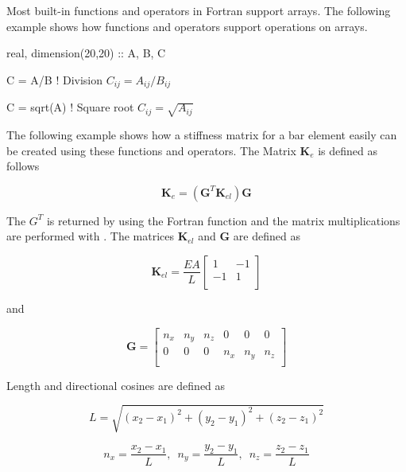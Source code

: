 Most built-in functions and operators in Fortran support arrays. The following example shows how functions and operators support operations on arrays.

\begin{fortrancodeenv}
real, dimension(20,20) :: A, B, C

C = A/B ! Division $C_{ij}=A_{ij}/B_{ij}$

C = sqrt(A) ! Square root $C_{ij}=\sqrt{A_{ij}}$
\end{fortrancodeenv}

The following example shows how a stiffness matrix for a bar element easily can be created using these functions and operators. The Matrix $\mathbf{K}_{e}$ is defined as follows

\begin{equation}
\mathbf{K}_{e} =(\mathbf{G}^{T} \mathbf{K}_{el} )\mathbf{G}
\end{equation}

The $G^T$ is returned by using the Fortran function  and the matrix multiplications are performed with . The matrices $\mathbf{K}_{el}$ and $\mathbf{G}$ are defined as

\begin{equation}
\mathbf{K}_{el} =\frac{EA}{L} \left[
\begin{array}{cc}
1 & -1 \\
-1 & 1 \\
\end{array}
\right]
\end{equation}

and

\begin{equation}
\mathbf{G}=\left[
\begin{array}{cccccc}
n_{x}  & n_{y}  & n_{z}  & 0 & 0 & 0 \\
0 & 0 & 0 & n_{x} & n_{y} & n_{z} \\
\end{array}
\right]
\end{equation}

Length and directional cosines are defined as

\begin{equation}
L=\sqrt{(x_{2} -x_{1} )^{2} +(y_{2} -y_{1} )^{2} +(z_{2} -z_{1}
)^{2}}
\end{equation}

\begin{equation}
n_{x} =\frac{x_{2} -x_{1} }{L} ,\,\,\,n_{y} =\frac{y_{2} -y_{1}
}{L} ,\,\,\,n_{z} =\frac{z_{2} -z_{1} }{L}
\end{equation}

